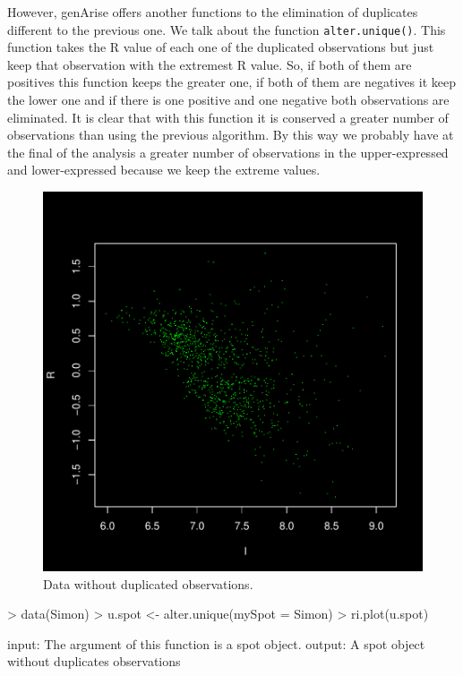 \documentclass[12pt]{article}
\begin{document}
However, genArise offers another functions to the elimination of duplicates different to the previous one. We talk about the function \texttt{alter.unique()}. This function takes the R value of each one of the duplicated observations but just keep that observation with the extremest R value. So, if both of them are positives this function keeps the greater one, if both of them are negatives it keep the lower one and if there is one positive and one negative both observations are eliminated. It is clear that with this function it is conserved a greater number of observations than using the previous algorithm. By this way we probably have at the final of the analysis a greater number of observations in the upper-expressed and lower-expressed because we keep the extreme values.
\begin{figure}[h]
\begin{center}
\includegraphics{example-genArise-014}
\caption{Data without duplicated observations.\label{fig11}}
\end{center}
\end{figure}
\begin{Scode}
> data(Simon)
> u.spot <- alter.unique(mySpot = Simon)
> ri.plot(u.spot)
\end{Scode}

\begin{Soutput}
input: The argument of this function is a spot object.
output: A spot object without duplicates observations
\end{Soutput}
\end{document}
